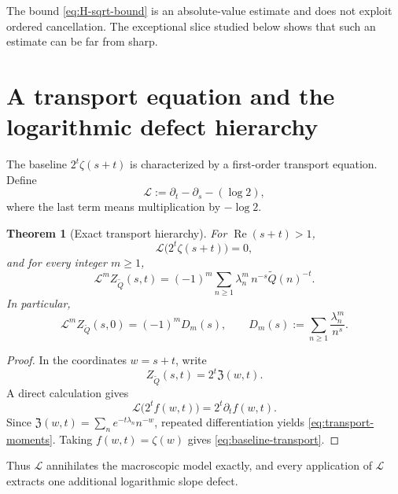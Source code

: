 \documentclass[11pt]{article}
\newtheorem{theorem}{Theorem}[section]
\theoremstyle{definition}
\theoremstyle{remark}
\newcommand{\Qp}{\widetilde Q}
\newcommand{\RePart}{\operatorname{Re}}
\newcommand{\Zn}{\mathfrak Z}
\begin{document}
The bound \eqref{eq:H-sqrt-bound} is an absolute-value estimate and does not
exploit ordered cancellation.  The exceptional slice studied below shows that
such an estimate can be far from sharp.

\section{A transport equation and the logarithmic defect hierarchy}

The baseline \(2^t\zeta(s+t)\) is characterized by a first-order transport equation.  Define
\begin{equation}
\mathcal L
:=\partial_t-\partial_s-(\log2),
\label{eq:transport-op}
\end{equation}
where the last term means multiplication by \(-\log2\).

\begin{theorem}[Exact transport hierarchy]
\label{thm:transport}
For \(\RePart(s+t)>1\),
\begin{equation}
\mathcal L\bigl(2^t\zeta(s+t)\bigr)=0,
\label{eq:baseline-transport}
\end{equation}
and for every integer \(m\ge1\),
\begin{equation}
{
\mathcal L^m Z_{\Qp}(s,t)
=(-1)^m
\sum_{n\ge1}
\lambda_n^m\,n^{-s}\Qp(n)^{-t}.
}
\label{eq:transport-moments}
\end{equation}
In particular,
\begin{equation}
\mathcal L^m Z_{\Qp}(s,0)
=(-1)^mD_m(s),
\qquad
D_m(s):=\sum_{n\ge1}\frac{\lambda_n^m}{n^s}.
\label{eq:Dm-def}
\end{equation}
\end{theorem}

\begin{proof}
In the coordinates \(w=s+t\), write
\[
Z_{\Qp}(s,t)=2^t\Zn(w,t).
\]
A direct calculation gives
\[
\mathcal L\bigl(2^tf(w,t)\bigr)=2^t\partial_tf(w,t).
\]
Since \(\Zn(w,t)=\sum_n e^{-t\lambda_n}n^{-w}\), repeated differentiation yields \eqref{eq:transport-moments}.  Taking \(f(w,t)=\zeta(w)\) gives \eqref{eq:baseline-transport}.
\end{proof}

Thus \(\mathcal L\) annihilates the macroscopic model exactly, and every application of \(\mathcal L\) extracts one additional logarithmic slope defect.
\end{document}
